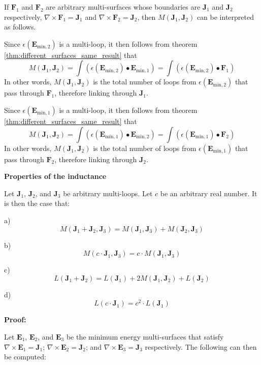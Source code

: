 If \(\mathbf{F}_1\) and \(\mathbf{F}_2\) are arbitrary multi-surfaces whose boundaries are \(\mathbf{J}_1\) and \(\mathbf{J}_2\) respectively, \(\nabla \times \mathbf{F}_1 = \mathbf{J}_1\) and \(\nabla \times \mathbf{F}_2 = \mathbf{J}_2\), then \(M(\mathbf{J}_1, \mathbf{J}_2)\) can be interpreted as follows. 

Since \(\epsilon(\mathbf{E}_{\text{min},2})\) is a multi-loop, it then follows from theorem \ref{thm:different_surfaces_same_result} that 
\[M(\mathbf{J}_1, \mathbf{J}_2) = \int (\epsilon(\mathbf{E}_{\text{min},2}) \bullet \mathbf{E}_{\text{min},1}) = \int (\epsilon(\mathbf{E}_{\text{min},2}) \bullet \mathbf{F}_1)\]
In other words, \(M(\mathbf{J}_1, \mathbf{J}_2)\) is the total number of loops from \(\epsilon(\mathbf{E}_{\text{min},2})\) that pass through \(\mathbf{F}_1\), therefore linking through \(\mathbf{J}_1\).

Since \(\epsilon(\mathbf{E}_{\text{min},1})\) is a multi-loop, it then follows from theorem \ref{thm:different_surfaces_same_result} that 
\[M(\mathbf{J}_1, \mathbf{J}_2) = \int (\epsilon(\mathbf{E}_{\text{min},1}) \bullet \mathbf{E}_{\text{min},2}) = \int (\epsilon(\mathbf{E}_{\text{min},1}) \bullet \mathbf{F}_2)\]
In other words, \(M(\mathbf{J}_1, \mathbf{J}_2)\) is the total number of loops from \(\epsilon(\mathbf{E}_{\text{min},1})\) that pass through \(\mathbf{F}_2\), therefore linking through \(\mathbf{J}_2\).

\vspace{5mm}

\textbf{Properties of the inductance}

\begin{thm}\label{thm:multi-loop_inductance_properties}
Let \(\mathbf{J}_1\), \(\mathbf{J}_2\), and \(\mathbf{J}_3\) be arbitrary multi-loops. Let \(c\) be an arbitrary real number. It is then the case that:

a)
\[M(\mathbf{J}_1 + \mathbf{J}_2, \mathbf{J}_3) = M(\mathbf{J}_1, \mathbf{J}_3) + M(\mathbf{J}_2, \mathbf{J}_3)\]

b)
\[M(c \cdot \mathbf{J}_1, \mathbf{J}_3) = c \cdot M(\mathbf{J}_1, \mathbf{J}_3)\]

c)
\[L(\mathbf{J}_1 + \mathbf{J}_2) = L(\mathbf{J}_1) + 2M(\mathbf{J}_1, \mathbf{J}_2) + L(\mathbf{J}_2)\]

d)
\[L(c \cdot \mathbf{J}_1) = c^2 \cdot L(\mathbf{J}_1)\]
\end{thm}
\textbf{Proof:}

Let \(\mathbf{E}_1\), \(\mathbf{E}_2\), and \(\mathbf{E}_3\) be the minimum energy multi-surfaces that satisfy \(\nabla \times \mathbf{E}_1 = \mathbf{J}_1\); \(\nabla \times \mathbf{E}_2 = \mathbf{J}_2\); and \(\nabla \times \mathbf{E}_3 = \mathbf{J}_3\) respectively. The following can then be computed:

